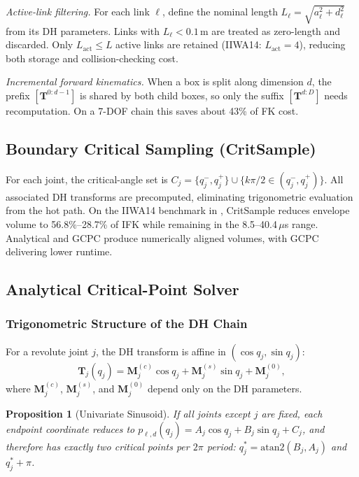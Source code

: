\documentclass[journal]{IEEEtran}
\newtheorem{proposition}{Proposition}
\begin{document}
\emph{Active-link filtering.}
For each link $\ell$, define the nominal length
$L_\ell = \sqrt{a_\ell^2 + d_\ell^2}$ from its DH parameters. Links
with $L_\ell < 0.1\,$m are treated as zero-length and discarded. Only
$L_{\text{act}} \leq L$ active links are retained
(IIWA14: $L_{\text{act}} = 4$), reducing both storage and
collision-checking cost.

\emph{Incremental forward kinematics.}
When a box is split along dimension $d$, the prefix
$[\bm{T}^{0:d-1}]$ is shared by both child boxes, so only the suffix
$[\bm{T}^{d:D}]$ needs recomputation. On a 7-DOF chain this saves about
43\% of FK cost.

\subsection{Boundary Critical Sampling (CritSample)}\label{sec:critsample}

For each joint, the critical-angle set is
$C_j = \{q_j^-, q_j^+\} \cup \{k\pi/2 \in (q_j^-, q_j^+)\}$.
All associated DH transforms are precomputed, eliminating trigonometric
evaluation from the hot path. On the IIWA14 benchmark in
, CritSample reduces envelope volume to
56.8\%--28.7\% of IFK while remaining in the 8.5--40.4\,$\mu$s range.
Analytical and GCPC produce numerically aligned volumes, with GCPC
delivering lower runtime.

\subsection{Analytical Critical-Point Solver}\label{sec:analytical}

\subsubsection{Trigonometric Structure of the DH Chain}

For a revolute joint $j$, the DH transform is affine in
$(\cos q_j, \sin q_j)$:
\begin{equation}\label{eq:dh_affine}
  \bm{T}_j(q_j) = \bm{M}_j^{(c)}\cos q_j + \bm{M}_j^{(s)}\sin q_j + \bm{M}_j^{(0)},
\end{equation}
where $\bm{M}_j^{(c)}$, $\bm{M}_j^{(s)}$, and $\bm{M}_j^{(0)}$ depend
only on the DH parameters.

\begin{proposition}[Univariate Sinusoid]\label{prop:sinusoid}
If all joints except $j$ are fixed, each endpoint coordinate reduces to
$p_{\ell,d}(q_j) = A_j\cos q_j + B_j\sin q_j + C_j$, and therefore has
exactly two critical points per $2\pi$ period:
$q_j^* = \mathrm{atan2}(B_j, A_j)$ and $q_j^* + \pi$.
\end{proposition}
\end{document}
